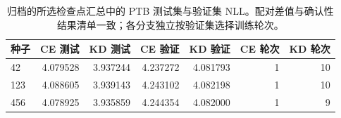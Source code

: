 \begin{table}[!t]\centering
\begin{tabular}{lrrrrrr}
\toprule
种子 & CE 测试 & KD 测试 & CE 验证 & KD 验证 & CE 轮次 & KD 轮次 \\
\midrule
42 & 4.079528 & 3.937244 & 4.237272 & 4.081793 & 1 & 10 \\
123 & 4.088605 & 3.939143 & 4.243102 & 4.082198 & 1 & 10 \\
456 & 4.078925 & 3.935859 & 4.244354 & 4.082000 & 1 & 9 \\
\bottomrule
\end{tabular}
\caption{归档的所选检查点汇总中的 PTB 测试集与验证集 NLL。配对差值与确认性结果清单一致；各分支独立按验证集选择训练轮次。}\label{tab:ptb_endpoints}
\end{table}
